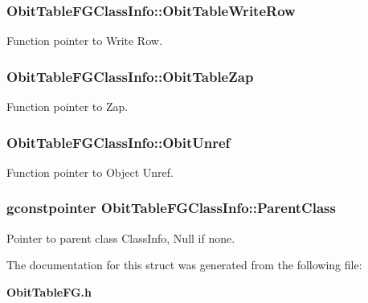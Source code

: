 \subsubsection{ {\bf Obit\-Table\-FGClass\-Info::Obit\-Table\-Write\-Row}}\label{structObitTableFGClassInfo_o26}


Function pointer to Write Row. 

\subsubsection{ {\bf Obit\-Table\-FGClass\-Info::Obit\-Table\-Zap}}\label{structObitTableFGClassInfo_o19}


Function pointer to Zap. 

\subsubsection{ {\bf Obit\-Table\-FGClass\-Info::Obit\-Unref}}\label{structObitTableFGClassInfo_o11}


Function pointer to Object Unref. 

\subsubsection{\setlength{\rightskip}{0pt plus 5cm}gconstpointer {\bf Obit\-Table\-FGClass\-Info::Parent\-Class}}\label{structObitTableFGClassInfo_o3}


Pointer to parent class Class\-Info, Null if none. 



The documentation for this struct was generated from the following file:\begin{CompactItemize}
\item 
{\bf Obit\-Table\-FG.h}\end{CompactItemize}
